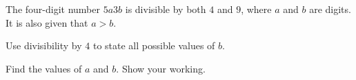  The four-digit number $5a3b$ is divisible by both $4$ and $9$, where $a$ and $b$ are digits. It is also given that $a>b$.

\begin{subparts}
  \item Use divisibility by $4$ to state all possible values of $b$.
  \item Find the values of $a$ and $b$. Show your working.
\end{subparts}

